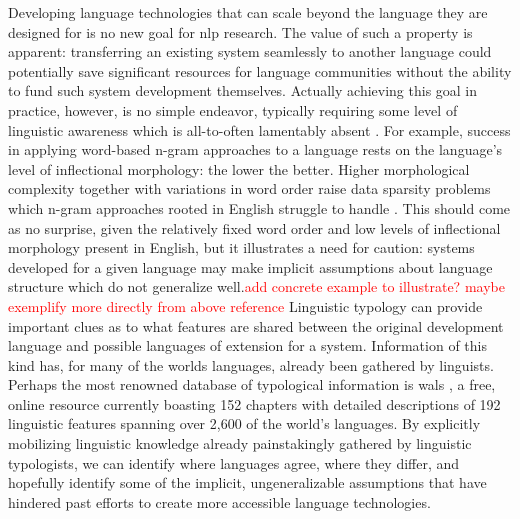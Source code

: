 \documentclass[thesis]{cluu}
\newcommand{\todo}[1]{\textcolor{red}{#1}}
\begin{document}
Developing language technologies that can scale beyond the language they are designed for is no new goal for \gls{nlp} research. The value of such a property is apparent: transferring an existing system seamlessly to another language could potentially save significant resources for language communities without the ability to fund such system development themselves. Actually achieving this goal in practice, however, is no simple endeavor, typically requiring some level of linguistic awareness which is all-to-often lamentably absent \parencite[see][inter alia]{benderAchievingEvaluatingLanguageIndependence2011,joshiStateFateLinguistic2021,hedderichSurveyRecentApproaches2021}. For example, success in applying word-based n-gram approaches to a language rests on the language's level of inflectional morphology: the lower the better. Higher morphological complexity together with variations in word order raise data sparsity problems which n-gram approaches rooted in English struggle to handle \parencite{benderAchievingEvaluatingLanguageIndependence2011}. This should come as no surprise, given the relatively fixed word order and low levels of inflectional morphology present in English, but it illustrates a need for caution: systems developed for a given language may make implicit assumptions about language structure which do not generalize well.\todo{add concrete example to illustrate? maybe exemplify more directly from above reference} Linguistic typology can provide important clues as to what features are shared between the original development language and possible languages of extension for a system. Information of this kind has, for many of the worlds languages, already been gathered by linguists. Perhaps the most renowned database of typological information is \gls{wals} \parencite{matthewdryerWorldAtlasLanguage2024}, a free, online resource currently boasting 152 chapters with detailed descriptions of 192 linguistic features spanning over 2,600 of the world's languages. By explicitly mobilizing linguistic knowledge already painstakingly gathered by linguistic typologists, we can identify where languages agree, where they differ, and hopefully identify some of the implicit, ungeneralizable assumptions that have hindered past efforts to create more accessible language technologies.
\end{document}
